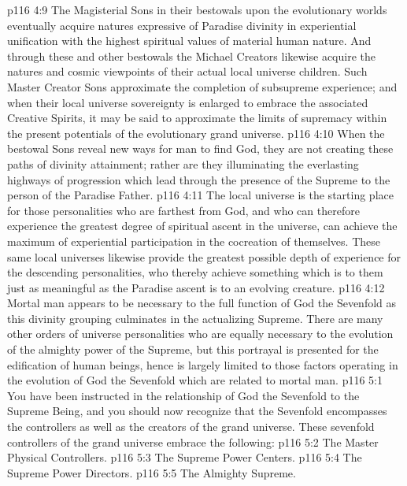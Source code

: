 \vs p116 4:9 The Magisterial Sons in their bestowals upon the evolutionary worlds eventually acquire natures expressive of Paradise divinity in experiential unification with the highest spiritual values of material human nature. And through these and other bestowals the Michael Creators likewise acquire the natures and cosmic viewpoints of their actual local universe children. Such Master Creator Sons approximate the completion of subsupreme experience; and when their local universe sovereignty is enlarged to embrace the associated Creative Spirits, it may be said to approximate the limits of supremacy within the present potentials of the evolutionary grand universe.
\vs p116 4:10 When the bestowal Sons reveal new ways for man to find God, they are not creating these paths of divinity attainment; rather are they illuminating the everlasting highways of progression which lead through the presence of the Supreme to the person of the Paradise Father.
\vs p116 4:11 The local universe is the starting place for those personalities who are farthest from God, and who can therefore experience the greatest degree of spiritual ascent in the universe, can achieve the maximum of experiential participation in the cocreation of themselves. These same local universes likewise provide the greatest possible depth of experience for the descending personalities, who thereby achieve something which is to them just as meaningful as the Paradise ascent is to an evolving creature.
\pc \vs p116 4:12 Mortal man appears to be necessary to the full function of God the Sevenfold as this divinity grouping culminates in the actualizing Supreme. There are many other orders of universe personalities who are equally necessary to the evolution of the almighty power of the Supreme, but this portrayal is presented for the edification of human beings, hence is largely limited to those factors operating in the evolution of God the Sevenfold which are related to mortal man.
\vs p116 5:1 You have been instructed in the relationship of God the Sevenfold to the Supreme Being, and you should now recognize that the Sevenfold encompasses the controllers as well as the creators of the grand universe. These sevenfold controllers of the grand universe embrace the following:\plusone
\pc \vs p116 5:2 \bibnobreakspace The Master Physical Controllers.
\vs p116 5:3 \bibnobreakspace The Supreme Power Centers.
\vs p116 5:4 \bibnobreakspace The Supreme Power Directors.
\vs p116 5:5 \bibnobreakspace The Almighty Supreme.
